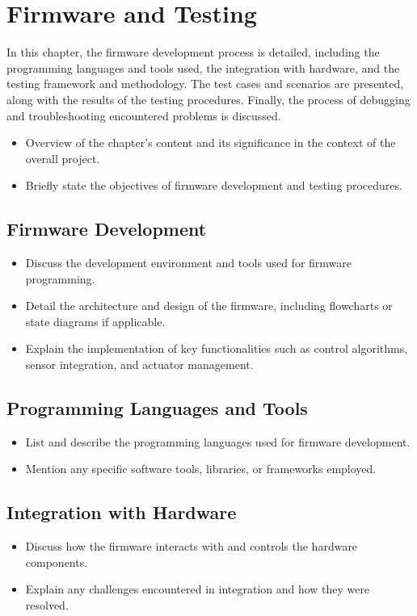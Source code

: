 \chapter{Firmware and Testing}

\graphicspath{{./Figures/Modeling}}
In this chapter, the firmware development process is detailed, including the programming languages and tools used, the integration with hardware, and the testing framework and methodology. The test cases and scenarios are presented, along with the results of the testing procedures. Finally, the process of debugging and troubleshooting encountered problems is discussed.

\begin{itemize}
	\item Overview of the chapter's content and its significance in the context of the overall project.
	\item Briefly state the objectives of firmware development and testing procedures.
\end{itemize}
\newpage

\section{Firmware Development}
\begin{itemize}
	\item Discuss the development environment and tools used for firmware programming.
	\item Detail the architecture and design of the firmware, including flowcharts or state  diagrams if applicable.
	\item Explain the implementation of key functionalities such as control algorithms, sensor integration, and actuator management.
\end{itemize}
\section{Programming Languages and Tools}
\begin{itemize}
	\item List and describe the programming languages used for firmware development.
	\item Mention any specific software tools, libraries, or frameworks employed.
\end{itemize}
\section{Integration with Hardware}
\begin{itemize}
	\item Discuss how the firmware interacts with and controls the hardware components.
	\item Explain any challenges encountered in integration and how they were resolved.
\end{itemize}
